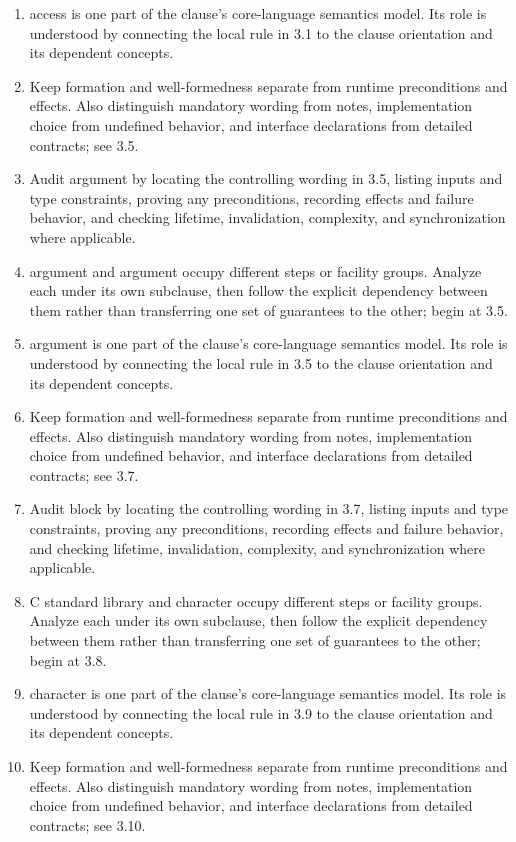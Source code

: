 \documentclass[11pt,letterpaper]{article}
\begin{document}
\begin{enumerate}
\item access is one part of the clause's core-language semantics model. Its role is understood by connecting the local rule in 3.1 to the clause orientation and its dependent concepts.
\item Keep formation and well-formedness separate from runtime preconditions and effects. Also distinguish mandatory wording from notes, implementation choice from undefined behavior, and interface declarations from detailed contracts; see 3.5.
\item Audit argument by locating the controlling wording in 3.5, listing inputs and type constraints, proving any preconditions, recording effects and failure behavior, and checking lifetime, invalidation, complexity, and synchronization where applicable.
\item argument and argument occupy different steps or facility groups. Analyze each under its own subclause, then follow the explicit dependency between them rather than transferring one set of guarantees to the other; begin at 3.5.
\item argument is one part of the clause's core-language semantics model. Its role is understood by connecting the local rule in 3.5 to the clause orientation and its dependent concepts.
\item Keep formation and well-formedness separate from runtime preconditions and effects. Also distinguish mandatory wording from notes, implementation choice from undefined behavior, and interface declarations from detailed contracts; see 3.7.
\item Audit block by locating the controlling wording in 3.7, listing inputs and type constraints, proving any preconditions, recording effects and failure behavior, and checking lifetime, invalidation, complexity, and synchronization where applicable.
\item C standard library and character occupy different steps or facility groups. Analyze each under its own subclause, then follow the explicit dependency between them rather than transferring one set of guarantees to the other; begin at 3.8.
\item character is one part of the clause's core-language semantics model. Its role is understood by connecting the local rule in 3.9 to the clause orientation and its dependent concepts.
\item Keep formation and well-formedness separate from runtime preconditions and effects. Also distinguish mandatory wording from notes, implementation choice from undefined behavior, and interface declarations from detailed contracts; see 3.10.

\end{enumerate}
\end{document}

